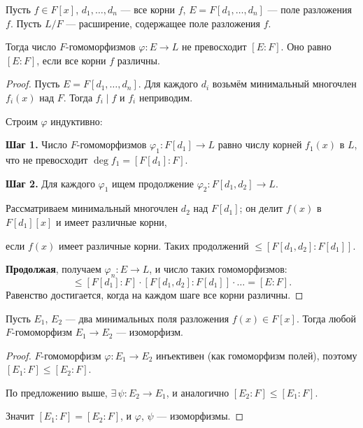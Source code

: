 \begin{stmt}
    Пусть $f \in F[x]$, $d_1, \dots, d_n$ --- все корни $f$, $E = F[d_1, \dots, d_n]$ --- поле разложения
    $f$.
    Пусть $L/F$ --- расширение, содержащее поле разложения $f$.

    Тогда число $F$-гомоморфизмов $\varphi\colon E \to L$ не превосходит $[E : F]$. Оно равно $[E : F]
    $, если все корни $f$ различны.

    \begin{proof}
        Пусть $E = F[d_1, \dots, d_n]$. Для каждого $d_i$ возьмём минимальный многочлен $f_i(x)$ над
        $F$. Тогда $f_i \mid f$ и $f_i$ неприводим.

        Строим $\varphi$ индуктивно:

        \textbf{Шаг 1.} Число $F$-гомоморфизмов $\varphi_1\colon F[d_1] \to L$ равно числу корней $f_1(x)
        $ в $L$, что не превосходит $\deg f_1 = [F[d_1] : F]$.

        \textbf{Шаг 2.} Для каждого $\varphi_1$ ищем продолжение $\varphi_2\colon F[d_1, d_2] \to L$.

        Рассматриваем минимальный многочлен $d_2$ над $F[d_1]$; он делит $f(x)$ в $F[d_1][x]$ и имеет различные корни,

        если $f(x)$ имеет различные корни. Таких продолжений $\leq [F[d_1, d_2] : F[d_1]]$.

        \textbf{Продолжая}, получаем $\varphi_n\colon E \to L$, и число таких гомоморфизмов:
        \[
            \leq [F[d_1] : F] \cdot [F[d_1, d_2] : F[d_1]] \cdot \ldots = [E : F].
        \]
        Равенство достигается, когда на каждом шаге все корни различны.
    \end{proof}
\end{stmt}


\begin{cor}
    Пусть $E_1$, $E_2$ --- два минимальных поля разложения $f(x) \in F[x]$. Тогда любой $F$-гомоморфизм
    $E_1 \to E_2$ --- изоморфизм.

    \begin{proof}
        $F$-гомоморфизм $\varphi\colon E_1 \to E_2$ инъективен (как гомоморфизм полей), поэтому $[E_1 :
        F] \leq [E_2 : F]$.

        По предложению выше, $\exists\, \psi\colon E_2 \to E_1$, и аналогично $[E_2 : F] \leq [E_1 : F]
        $.

        Значит $[E_1 : F] = [E_2 : F]$, и $\varphi$, $\psi$ --- изоморфизмы.
    \end{proof}
\end{cor}


